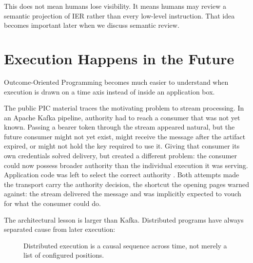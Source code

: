 \documentclass[10pt,oneside,openany]{book}
\begin{document}
This does not mean humans lose visibility. It means humans may review a semantic projection of IER rather than every low-level instruction. That idea becomes important later when we discuss semantic review.


\chapter{Execution Happens in the Future}

Outcome-Oriented Programming becomes much easier to understand when execution is drawn on a time axis instead of inside an application box.

The public PIC material traces the motivating problem to stream processing. In an Apache Kafka pipeline, authority had to reach a consumer that was not yet known. Passing a bearer token through the stream appeared natural, but the future consumer might not yet exist, might receive the message after the artifact expired, or might not hold the key required to use it. Giving that consumer its own credentials solved delivery, but created a different problem: the consumer could now possess broader authority than the individual execution it was serving. Application code was left to select the correct authority \cite{picwhy}. Both attempts made the transport carry the authority decision, the shortcut the opening pages warned against: the stream delivered the message and was implicitly expected to vouch for what the consumer could do.

The architectural lesson is larger than Kafka. Distributed programs have always separated cause from later execution:

\begin{figure}[ht]
\centering
{}
\caption{Distributed execution is a causal sequence across time, not merely a list of configured positions.}
\end{figure}
\end{document}
